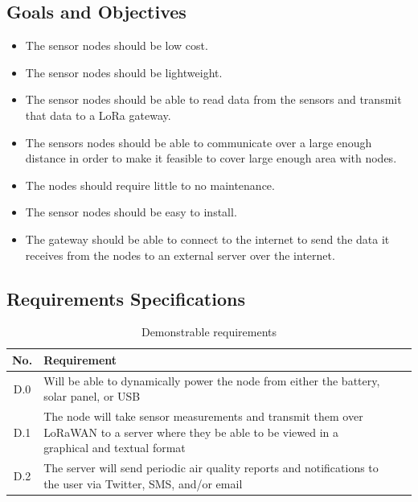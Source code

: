 \subsection{Goals and Objectives}
\begin{itemize}
    \item The sensor nodes should be low cost.
    \item The sensor nodes should be lightweight.
    \item The sensor nodes should be able to read data from the sensors and transmit that data to a LoRa gateway.
    \item The sensors nodes should be able to communicate over a large enough distance in order to make it feasible to cover large enough area with nodes.
    \item The nodes should require little to no maintenance.
    \item The sensor nodes should be easy to install.
    \item The gateway should be able to connect to the internet to send the data it receives from the nodes to an external server over the internet.
\end{itemize}


\subsection{Requirements Specifications}

\begin{table}[H]
\centering
\caption{Demonstrable requirements}
\begin{tabularx}{\linewidth}{|c|X|c|c|}
\hline
No. & Requirement \\
\hline\hline
D.0 & Will be able to dynamically power the node from either the battery, solar
panel, or USB \\\hline
D.1 & The node will take sensor measurements and transmit them over LoRaWAN to a
server where they be able to be viewed in a graphical and textual format
\\\hline
D.2 & The server will send periodic air quality reports and notifications to the
user via Twitter, SMS, and/or email \\\hline

\end{tabularx}
\label{tab:demon-requirements}
\end{table}

